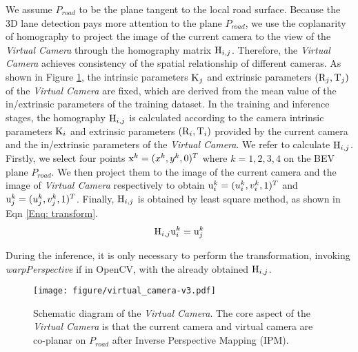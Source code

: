 \documentclass[10pt,twocolumn,letterpaper]{article}
\begin{document}
We assume $P_{road}$ to be the plane tangent to the local road surface. Because the 3D lane detection pays more attention to the plane $P_{road}$, we use the coplanarity of homography to project the image of the current camera to the view of the \textit{Virtual Camera} through the homography matrix ${{\rm{H}}_{i,j}}$. Therefore, the \textit{Virtual Camera} achieves consistency of the spatial relationship of different cameras.
As shown in Figure \ref{fig:virtual}, the intrinsic parameters ${{\rm{K}}_j}$ and extrinsic parameters ${\rm{(}}{{\rm{R}}_j},{{\rm{T}}_j})$ of the \textit{Virtual Camera} are fixed, which are derived from the mean value of the in/extrinsic parameters of the training dataset. In the training and inference stages, the homography ${{\rm{H}}_{i,j}}$ is calculated according to the camera intrinsic parameters ${{\rm{K}}_i}$ and extrinsic parameters ${\rm{(}}{{\rm{R}}_i},{{\rm{T}}_i})$ provided by the current camera and the in/extrinsic parameters of the \textit{Virtual Camera}. We refer \cite{homographies} to calculate  ${{\rm{H}}_{i,j}}$.  Firstly, we select four points ${\rm{x}}^k = {(x^k,y^k,0)^T}$ where $k=1,2,3,4$ on the BEV plane $P_{road}$. We then project them to the image of the current camera and the image of \textit{Virtual Camera} respectively to obtain ${\rm{u}}_i^k = {(u_i^k,v_i^k,1)^T}$ and ${\rm{u}}_j^k = {(u_j^k,v_j^k,1)^T}$. Finally, ${{\rm{H}}_{i,j}}$ is obtained by least square method, as shown in Eqn \ref{Enq: transform}.
\begin{equation}
{{\rm{H}}_{i,j}}{\rm{u}}_i^k = {\rm{u}}_j^k
\label{Enq: transform}
\end{equation}

During the inference, it is only necessary to perform the transformation, invoking \textit{warpPerspective} if in OpenCV, with the already obtained ${\rm{H}}_{i,j}$. 

\begin{figure}
    \centering
\texttt{[image: figure/virtual\_camera-v3.pdf]}
\caption{Schematic diagram of the \textit{Virtual Camera}. The core aspect of the \textit{Virtual Camera} is that the current camera and virtual camera are co-planar on $P_{road}$ after Inverse Perspective Mapping (IPM).}
    \label{fig:virtual}
\end{figure}
\end{document}
